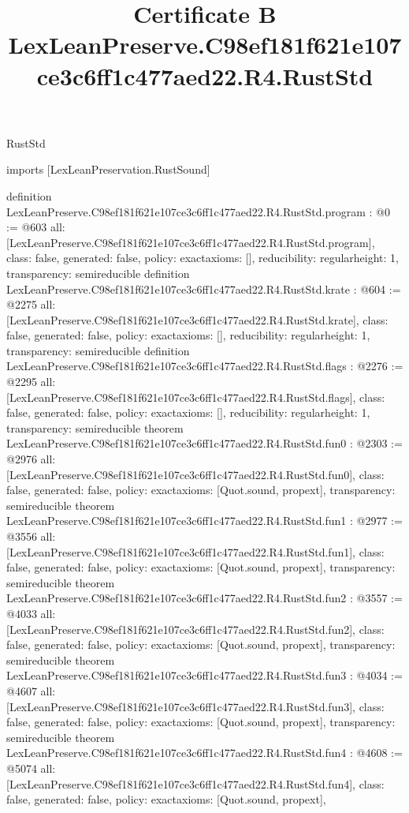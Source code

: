 \begin{lexlean}{RustStd}
\title{Certificate B LexLeanPreserve.C98ef181f621e107ce3c6ff1c477aed22.R4.RustStd}
\begin{coremodule}
imports [LexLeanPreservation.RustSound]

definition LexLeanPreserve.C98ef181f621e107ce3c6ff1c477aed22.R4.RustStd.program : @0 := @603 {
  all: [LexLeanPreserve.C98ef181f621e107ce3c6ff1c477aed22.R4.RustStd.program],
  class: false,
  generated: false,
  policy: exact{axioms: []},
  reducibility: regular{height: 1},
  transparency: semireducible
}
definition LexLeanPreserve.C98ef181f621e107ce3c6ff1c477aed22.R4.RustStd.krate : @604 := @2275 {
  all: [LexLeanPreserve.C98ef181f621e107ce3c6ff1c477aed22.R4.RustStd.krate],
  class: false,
  generated: false,
  policy: exact{axioms: []},
  reducibility: regular{height: 1},
  transparency: semireducible
}
definition LexLeanPreserve.C98ef181f621e107ce3c6ff1c477aed22.R4.RustStd.flags : @2276 := @2295 {
  all: [LexLeanPreserve.C98ef181f621e107ce3c6ff1c477aed22.R4.RustStd.flags],
  class: false,
  generated: false,
  policy: exact{axioms: []},
  reducibility: regular{height: 1},
  transparency: semireducible
}
theorem LexLeanPreserve.C98ef181f621e107ce3c6ff1c477aed22.R4.RustStd.fun0 : @2303 := @2976 {
  all: [LexLeanPreserve.C98ef181f621e107ce3c6ff1c477aed22.R4.RustStd.fun0],
  class: false,
  generated: false,
  policy: exact{axioms: [Quot.sound, propext]},
  transparency: semireducible
}
theorem LexLeanPreserve.C98ef181f621e107ce3c6ff1c477aed22.R4.RustStd.fun1 : @2977 := @3556 {
  all: [LexLeanPreserve.C98ef181f621e107ce3c6ff1c477aed22.R4.RustStd.fun1],
  class: false,
  generated: false,
  policy: exact{axioms: [Quot.sound, propext]},
  transparency: semireducible
}
theorem LexLeanPreserve.C98ef181f621e107ce3c6ff1c477aed22.R4.RustStd.fun2 : @3557 := @4033 {
  all: [LexLeanPreserve.C98ef181f621e107ce3c6ff1c477aed22.R4.RustStd.fun2],
  class: false,
  generated: false,
  policy: exact{axioms: [Quot.sound, propext]},
  transparency: semireducible
}
theorem LexLeanPreserve.C98ef181f621e107ce3c6ff1c477aed22.R4.RustStd.fun3 : @4034 := @4607 {
  all: [LexLeanPreserve.C98ef181f621e107ce3c6ff1c477aed22.R4.RustStd.fun3],
  class: false,
  generated: false,
  policy: exact{axioms: [Quot.sound, propext]},
  transparency: semireducible
}
theorem LexLeanPreserve.C98ef181f621e107ce3c6ff1c477aed22.R4.RustStd.fun4 : @4608 := @5074 {
  all: [LexLeanPreserve.C98ef181f621e107ce3c6ff1c477aed22.R4.RustStd.fun4],
  class: false,
  generated: false,
  policy: exact{axioms: [Quot.sound, propext]},
}
\end{coremodule}
\end{lexlean}
